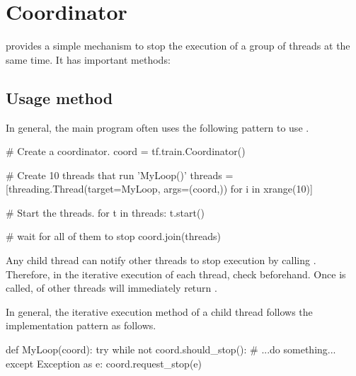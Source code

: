 \section{Coordinator}
\begin{content}
 provides a simple mechanism to stop the execution of a group of threads at the same time. It has  important methods:

\begin{enum}
\end{enum}


\subsection{Usage method}
In general, the main program often uses the following pattern to use .

\begin{leftbar}
\begin{python}
# Create a coordinator.
coord = tf.train.Coordinator()

# Create 10 threads that run 'MyLoop()'
threads = [threading.Thread(target=MyLoop, args=(coord,)) 
          for i in xrange(10)]

# Start the threads.
for t in threads:
  t.start()
  
# wait for all of them to stop
coord.join(threads)
\end{python}
\end{leftbar}

Any child thread can notify other threads to stop execution by calling . Therefore, in the iterative execution of each thread, check  beforehand. Once  is called,  of other threads will immediately return .

In general, the iterative execution method of a child thread follows the implementation pattern as follows.

\begin{leftbar}
\begin{python}
def MyLoop(coord):
  try
    while not coord.should_stop():
      # ...do something...
  except Exception as e:
    coord.request_stop(e)
\end{python}
\end{leftbar}



\end{content}
